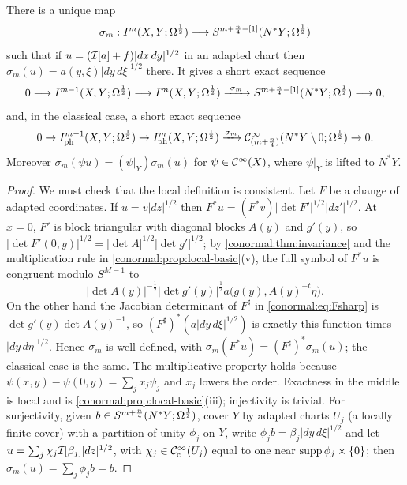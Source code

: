 \begin{theorem}\label{conormal:thm:symbol}
  There is a unique map
  \begin{equation*}
    \sigma_m:I^{m}(X,Y;\Omega^{\frac12})\longrightarrow S^{m+\frac n4-[1]}(N^*Y;\Omega^{\frac12})
  \end{equation*}
  such that if $u=(\mathcal{I}[a]+f)|dx\,dy|^{1/2}$ in an adapted chart then
  $\sigma_m(u)=a(y,\xi)|dy\,d\xi|^{1/2}$ there.  It gives a short exact sequence
  \begin{equation}\label{conormal:eq:exact}
    0\longrightarrow I^{m-1}(X,Y;\Omega^{\frac12})\longrightarrow I^{m}(X,Y;\Omega^{\frac12})
    \xrightarrow{\ \sigma_m\ }S^{m+\frac n4-[1]}(N^*Y;\Omega^{\frac12})\longrightarrow0,
  \end{equation}
  and, in the classical case, a short exact sequence
  \begin{equation*}
    0\to I^{m-1}_{\mathrm{ph}}(X,Y;\Omega^{\frac12})\to I^{m}_{\mathrm{ph}}(X,Y;\Omega^{\frac12})
    \xrightarrow{\sigma_m}\mathcal{C}^\infty_{(m+\frac n4)}(N^*Y\setminus0;\Omega^{\frac12})\to0.
  \end{equation*}
  Moreover $\sigma_m(\psi u)=(\psi|_Y)\sigma_m(u)$ for $\psi\in\mathcal{C}^\infty(X)$, where
  $\psi|_Y$ is lifted to $N^*Y$.
\end{theorem}
\begin{proof}
  We must check that the local definition is consistent.  Let $F$ be a change of
  adapted coordinates.  If $u=v|dz|^{1/2}$ then $F^*u=(F^*v)|\det
  F'|^{1/2}|dz'|^{1/2}$.  At $x=0$, $F'$ is block triangular with diagonal
  blocks $A(y)$ and $g'(y)$, so $|\det F'(0,y)|^{1/2}=|\det A|^{1/2}|\det
  g'|^{1/2}$; by \cref{conormal:thm:invariance} and the multiplication rule in
  \cref{conormal:prop:local-basic}(v), the full symbol of $F^*u$ is congruent
  modulo $S^{M-1}$ to
  \begin{equation*}
    |\det A(y)|^{-\frac12}|\det g'(y)|^{\frac12}a\big(g(y),A(y)^{-t}\eta\big).
  \end{equation*}
  On the other hand the Jacobian determinant of $F^\sharp$ in
  \eqref{conormal:eq:Fsharp} is $\det g'(y)\det A(y)^{-1}$, so
  $(F^\sharp)^*(a|dy\,d\xi|^{1/2})$ is exactly this function times
  $|dy\,d\eta|^{1/2}$.  Hence $\sigma_m$ is well defined, with
  $\sigma_m(F^*u)=(F^\sharp)^*\sigma_m(u)$; the classical case is the same.
  The multiplicative property holds because $\psi(x,y)-\psi(0,y)=\sum_jx_j\psi_j$
  and $x_j$ lowers the order.  Exactness in the middle is local and is
  \cref{conormal:prop:local-basic}(iii); injectivity is trivial.  For
  surjectivity, given $b\in S^{m+\frac n4}(N^*Y;\Omega^{\frac12})$, cover $Y$ by adapted
  charts $U_j$ (a locally finite cover) with a partition of unity $\phi_j$ on $Y$,
  write $\phi_jb=\beta_j|dy\,d\xi|^{1/2}$ and let
  $u=\sum_j\chi_j\mathcal{I}[\beta_j]|dz|^{1/2}$, with $\chi_j\in\mathcal{C}^\infty_{\mathrm{c}}(U_j)$ equal to one
  near $\operatorname{supp}\phi_j\times\{0\}$; then $\sigma_m(u)=\sum_j\phi_jb=b$.
\end{proof}

